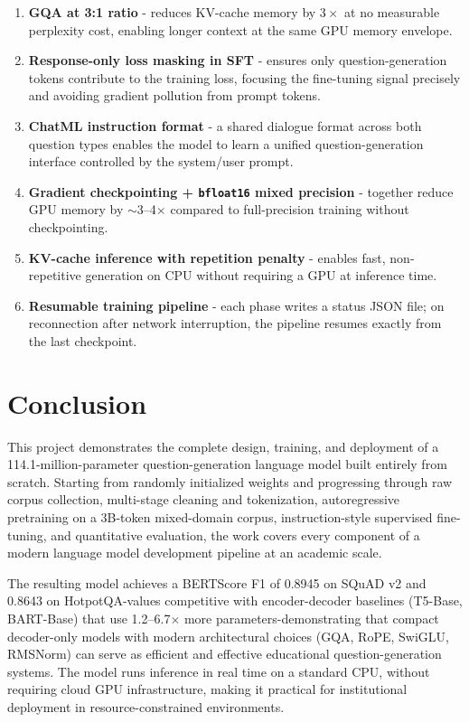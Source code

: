 \documentclass[12pt]{article}
\begin{document}
\begin{enumerate}[leftmargin=1.2cm]
  \item \textbf{GQA at 3:1 ratio} - reduces KV-cache memory by $3\times$ at no measurable perplexity cost, enabling longer context at the same GPU memory envelope.
  \item \textbf{Response-only loss masking in SFT} - ensures only question-generation tokens contribute to the training loss, focusing the fine-tuning signal precisely and avoiding gradient pollution from prompt tokens.
  \item \textbf{ChatML instruction format} - a shared dialogue format across both question types enables the model to learn a unified question-generation interface controlled by the system/user prompt.
  \item \textbf{Gradient checkpointing + \texttt{bfloat16} mixed precision} - together reduce GPU memory by $\sim$3--4$\times$ compared to full-precision training without checkpointing.
  \item \textbf{KV-cache inference with repetition penalty} - enables fast, non-repetitive generation on CPU without requiring a GPU at inference time.
  \item \textbf{Resumable training pipeline} - each phase writes a status JSON file; on reconnection after network interruption, the pipeline resumes exactly from the last checkpoint.
\end{enumerate}

\section{Conclusion}

This project demonstrates the complete design, training, and deployment of a 114.1-million-parameter question-generation language model built entirely from scratch. Starting from randomly initialized weights and progressing through raw corpus collection, multi-stage cleaning and tokenization, autoregressive pretraining on a 3B-token mixed-domain corpus, instruction-style supervised fine-tuning, and quantitative evaluation, the work covers every component of a modern language model development pipeline at an academic scale.

The resulting model achieves a BERTScore F1 of 0.8945 on SQuAD v2 and 0.8643 on HotpotQA-values competitive with encoder-decoder baselines (T5-Base, BART-Base) that use 1.2--6.7$\times$ more parameters-demonstrating that compact decoder-only models with modern architectural choices (GQA, RoPE, SwiGLU, RMSNorm) can serve as efficient and effective educational question-generation systems. The model runs inference in real time on a standard CPU, without requiring cloud GPU infrastructure, making it practical for institutional deployment in resource-constrained environments.
\end{document}
